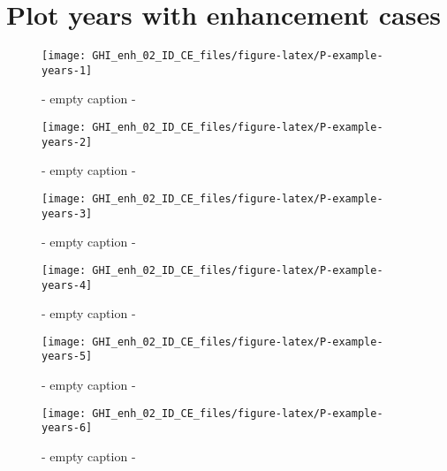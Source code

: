 \documentclass[
  10pt,
  a4paper,oneside]{article}
\begin{document}
\hypertarget{plot-years-with-enhancement-cases}{%
\section{Plot years with enhancement cases}\label{plot-years-with-enhancement-cases}}

\begin{figure}[H]

{\centering \texttt{[image: GHI\_enh\_02\_ID\_CE\_files/figure-latex/P-example-years-1]} 

}

\caption{ - empty caption - }\label{fig:P-example-years-1}
\end{figure}
\begin{figure}[H]

{\centering \texttt{[image: GHI\_enh\_02\_ID\_CE\_files/figure-latex/P-example-years-2]} 

}

\caption{ - empty caption - }\label{fig:P-example-years-2}
\end{figure}
\begin{figure}[H]

{\centering \texttt{[image: GHI\_enh\_02\_ID\_CE\_files/figure-latex/P-example-years-3]} 

}

\caption{ - empty caption - }\label{fig:P-example-years-3}
\end{figure}
\begin{figure}[H]

{\centering \texttt{[image: GHI\_enh\_02\_ID\_CE\_files/figure-latex/P-example-years-4]} 

}

\caption{ - empty caption - }\label{fig:P-example-years-4}
\end{figure}
\begin{figure}[H]

{\centering \texttt{[image: GHI\_enh\_02\_ID\_CE\_files/figure-latex/P-example-years-5]} 

}

\caption{ - empty caption - }\label{fig:P-example-years-5}
\end{figure}
\begin{figure}[H]

{\centering \texttt{[image: GHI\_enh\_02\_ID\_CE\_files/figure-latex/P-example-years-6]} 

}

\caption{ - empty caption - }\label{fig:P-example-years-6}
\end{figure}
\end{document}
